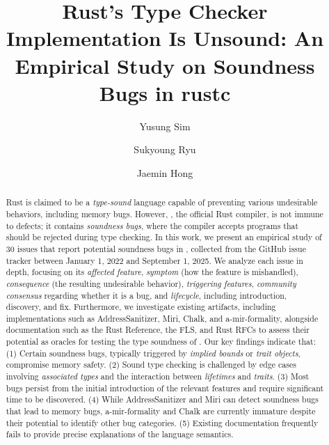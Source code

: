 \documentclass[acmsmall]{acmart}   %
\begin{document}
\title{Rust's Type Checker Implementation Is Unsound: An Empirical Study on Soundness Bugs in rustc}

\author{Yusung Sim}

\author{Sukyoung Ryu}

\author{Jaemin Hong}


\begin{abstract}
  Rust is claimed to be a \emph{type-sound} language capable of preventing
  various undesirable behaviors, including memory bugs.
  However, \rustc{}, the official Rust compiler, is not immune to defects;
  it contains \emph{soundness bugs}, where the compiler accepts programs that
  should be rejected during type checking.
  In this work, we present an empirical study of 30 issues that report potential
  soundness bugs in \rustc{}, collected from the GitHub issue tracker between
  January 1, 2022 and September 1, 2025.
  We analyze each issue in depth, focusing on its \emph{affected feature},
  \emph{symptom} (how the feature is mishandled), \emph{consequence} (the
  resulting undesirable behavior), \emph{triggering features}, \emph{community
  consensus} regarding whether it is a bug, and \emph{lifecycle}, including
  introduction, discovery, and fix.
  Furthermore, we investigate existing artifacts, including implementations such
  as AddressSanitizer, Miri, Chalk, and a-mir-formality, alongside documentation
  such as the Rust Reference, the FLS, and Rust RFCs to assess their potential
  as oracles for testing the type soundness of \rustc{}.
  Our key findings indicate that:
  (1) Certain soundness bugs, typically triggered by \emph{implied bounds} or
  \emph{trait objects}, compromise memory safety.
  (2) Sound type checking is challenged by edge cases involving \emph{associated
  types} and the interaction between \emph{lifetimes} and \emph{traits}.
  (3) Most bugs persist from the initial introduction of the relevant features
  and require significant time to be discovered.
  (4) While AddressSanitizer and Miri can detect soundness bugs that lead to
  memory bugs, a-mir-formality and Chalk are currently immature despite their
  potential to identify other bug categories.
  (5) Existing documentation frequently fails to provide precise explanations of
  the language semantics.
\end{abstract}
\end{document}
